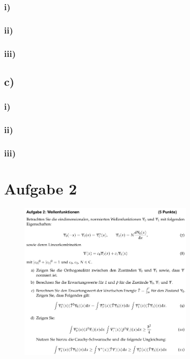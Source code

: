 \subsubsection{i)}

\subsubsection{ii)}

\subsubsection{iii)}

\subsection{c)}

\subsubsection{i)}

\subsubsection{ii)}

\subsubsection{iii)}



\section{Aufgabe 2}

\begin{figure}[H]
    \centering
    \includegraphics[width=0.75\textwidth]{images/Aufgabe_2.jpg}
    \label{fig:2}
\end{figure}

